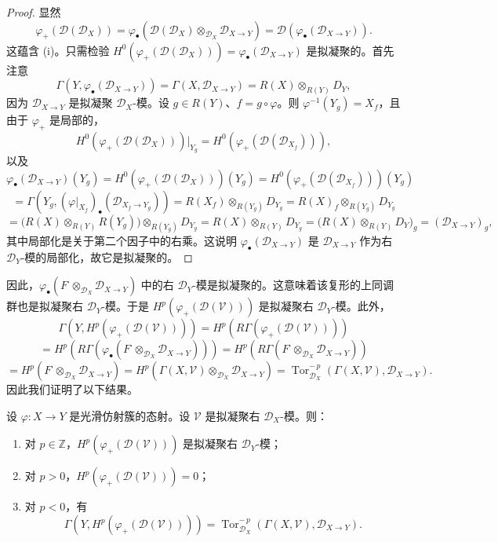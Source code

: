 \begin{proof}
显然
$$\varphi_+(\mathcal{D}(\mathcal{D}_X))=\varphi_\bullet(\mathcal{D}(\mathcal{D}_X)\otimes_{\mathcal{D}_X}\mathcal{D}_{X\to Y})
=\mathcal{D}(\varphi_\bullet(\mathcal{D}_{X\to Y})).$$
这蕴含 (i)。只需检验 $H^0(\varphi_+(\mathcal{D}(\mathcal{D}_X)))=\varphi_\bullet(\mathcal{D}_{X\to Y})$ 是拟凝聚的。首先注意
$$\Gamma(Y,\varphi_\bullet(\mathcal{D}_{X\to Y}))=\Gamma(X,\mathcal{D}_{X\to Y})=R(X)\otimes_{R(Y)}D_Y,$$
因为 $\mathcal{D}_{X\to Y}$ 是拟凝聚 $\mathcal{D}_X$-模。设 $g\in R(Y)$、$f=g\circ\varphi$。则 $\varphi^{-1}(Y_g)=X_f$，且由于 $\varphi_+$ 是局部的，
$$H^0(\varphi_+(\mathcal{D}(\mathcal{D}_X)))|_{Y_g}=H^0(\varphi_+(\mathcal{D}(\mathcal{D}_{X_f}))),$$
以及
$$\varphi_\bullet(\mathcal{D}_{X\to Y})(Y_g)=H^0(\varphi_+(\mathcal{D}(\mathcal{D}_X)))(Y_g)
=H^0(\varphi_+(\mathcal{D}(\mathcal{D}_{X_f})))(Y_g)$$
$$=\Gamma(Y_g,(\varphi|_{X_f})_\bullet(\mathcal{D}_{X_f\to Y_g}))
=R(X_f)\otimes_{R(Y_g)}D_{Y_g}=R(X)_f\otimes_{R(Y_g)}D_{Y_g}$$
$$=\bigl(R(X)\otimes_{R(Y)}R(Y_g)\bigr)\otimes_{R(Y_g)}D_{Y_g}
=R(X)\otimes_{R(Y)}D_{Y_g}=\bigl(R(X)\otimes_{R(Y)}D_Y\bigr)_g=(\mathcal{D}_{X\to Y})_g,$$
其中局部化是关于第二个因子中的右乘。这说明 $\varphi_\bullet(\mathcal{D}_{X\to Y})$ 是 $\mathcal{D}_{X\to Y}$ 作为右 $\mathcal{D}_Y$-模的局部化，故它是拟凝聚的。
\end{proof}

因此，$\varphi_\bullet(F^\cdot\otimes_{\mathcal{D}_X}\mathcal{D}_{X\to Y})$ 中的右 $\mathcal{D}_Y$-模是拟凝聚的。这意味着该复形的上同调群也是拟凝聚右 $\mathcal{D}_Y$-模。于是 $H^p(\varphi_+(\mathcal{D}(\mathcal{V})))$ 是拟凝聚右 $\mathcal{D}_Y$-模。此外，
$$\Gamma(Y,H^p(\varphi_+(\mathcal{D}(\mathcal{V}))))=H^p(R\Gamma(\varphi_+(\mathcal{D}(\mathcal{V}))))$$
$$=H^p(R\Gamma(\varphi_\bullet(F^\cdot\otimes_{\mathcal{D}_X}\mathcal{D}_{X\to Y})))
=H^p(R\Gamma(F^\cdot\otimes_{\mathcal{D}_X}\mathcal{D}_{X\to Y}))$$
$$=H^p(F^\cdot\otimes_{\mathcal{D}_X}\mathcal{D}_{X\to Y})
=H^p(\Gamma(X,\mathcal{V})\otimes_{\mathcal{D}_X}\mathcal{D}_{X\to Y})
=\operatorname{Tor}^{-\,p}_{\mathcal{D}_X}(\Gamma(X,\mathcal{V}),\mathcal{D}_{X\to Y}).$$
因此我们证明了以下结果。

\begin{proposition}\label{prop:4.5.5}
设 $\varphi:X\to Y$ 是光滑仿射簇的态射。设 $\mathcal{V}$ 是拟凝聚右 $\mathcal{D}_X$-模。则：
\begin{enumerate}[label=(\roman*)]
  \item 对 $p\in\mathbb{Z}$，$H^p(\varphi_+(\mathcal{D}(\mathcal{V})))$ 是拟凝聚右 $\mathcal{D}_Y$-模；
  \item 对 $p>0$，$H^p(\varphi_+(\mathcal{D}(\mathcal{V})))=0$；
  \item 对 $p<0$，有
    $$\Gamma(Y,H^p(\varphi_+(\mathcal{D}(\mathcal{V}))))
    =\operatorname{Tor}^{-\,p}_{\mathcal{D}_X}(\Gamma(X,\mathcal{V}),\mathcal{D}_{X\to Y}).$$
\end{enumerate}
\end{proposition}


